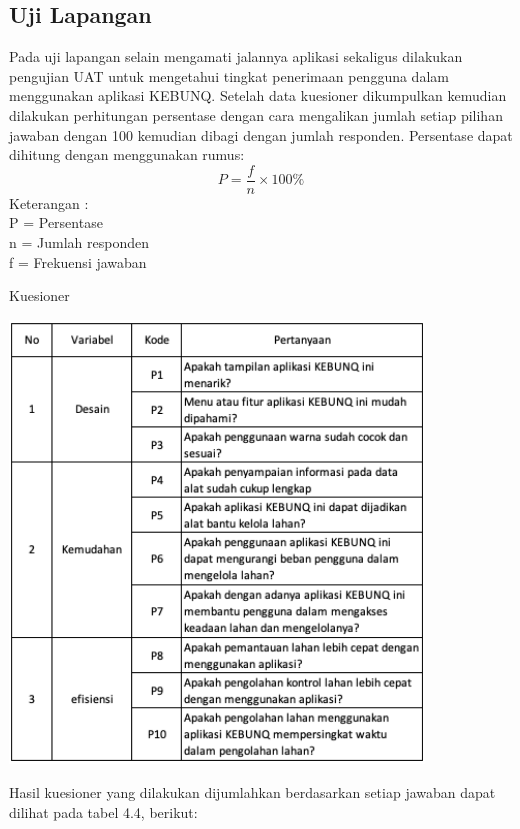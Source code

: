 \begin{flushleft}
\begin{justify}
        \subsection{Uji Lapangan}
        Pada uji lapangan selain mengamati jalannya aplikasi sekaligus dilakukan pengujian UAT untuk mengetahui tingkat penerimaan pengguna dalam menggunakan aplikasi KEBUNQ.
        Setelah data kuesioner dikumpulkan kemudian dilakukan perhitungan persentase dengan cara mengalikan jumlah setiap pilihan jawaban 
        dengan 100 kemudian dibagi dengan jumlah responden. Persentase dapat dihitung dengan menggunakan rumus:
        \begin{equation}
            P = \frac{f}{n} \times 100\%
         \end{equation}
         \noindent Keterangan :
         \\P = Persentase
         \\n = Jumlah responden
         \\f = Frekuensi jawaban\\
         \begin{table}[ht]
            \centering
            \caption{Kuesioner}
            \includegraphics[width=11cm]{images/bab 4/uat.png}\\
            \end{table}
       \newline \noindent Hasil kuesioner yang dilakukan dijumlahkan berdasarkan setiap jawaban dapat dilihat pada tabel 4.4, berikut:\\

\end{justify}
\end{flushleft}
